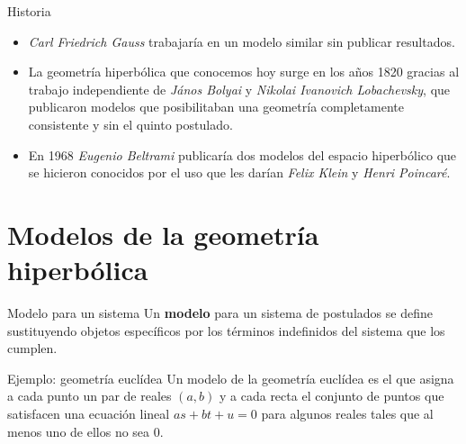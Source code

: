 \documentclass[compress]{beamer}
\begin{document}
\begin{frame}{Historia}
  \begin{itemize}
  \item \textit{Carl Friedrich Gauss} trabajaría en un modelo similar
    sin publicar resultados.
    \pause
    
  \item La geometría hiperbólica que conocemos hoy surge en los años
    1820 gracias al trabajo independiente de \textit{János Bolyai} y
    \textit{Nikolai Ivanovich Lobachevsky}, que publicaron modelos que
    posibilitaban una geometría completamente consistente y sin el
    quinto postulado.
    \pause
    
  \item En 1968 \textit{Eugenio Beltrami} publicaría dos modelos del
    espacio hiperbólico que se hicieron conocidos por el uso que les
    darían \textit{Felix Klein} y \textit{Henri Poincaré}.
  \end{itemize}
\end{frame}
  
\section{Modelos de la geometría hiperbólica}
\begin{frame}{Modelo para un sistema}
  Un \textbf{modelo} para un sistema de postulados se define
  sustituyendo objetos específicos por los términos indefinidos del
  sistema que los cumplen.
  \pause
  
  \begin{exampleblock}{Ejemplo: geometría euclídea}
    Un modelo de la geometría euclídea es el que asigna a cada punto un par de reales $(a,b)$
    y a cada recta el conjunto de puntos que satisfacen una ecuación lineal $as+bt+u = 0$ para
    algunos reales tales que al menos uno de ellos no sea $0$.
  \end{exampleblock}
\end{frame}
\end{document}
